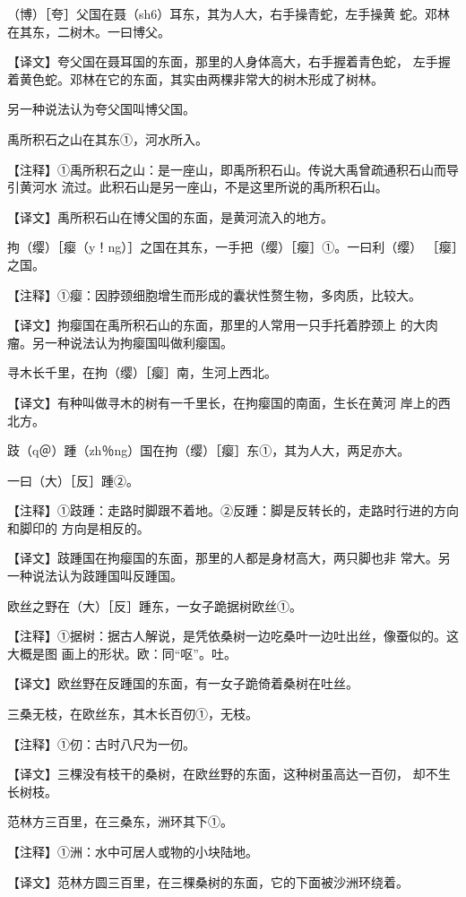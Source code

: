 \documentclass[a4paper,12pt,UTF8,twoside]{ctexbook}
\begin{document}
（博）［夸］父国在聂（sh6）耳东，其为人大，右手操青蛇，左手操黄 蛇。邓林在其东，二树木。一曰博父。

【译文】夸父国在聂耳国的东面，那里的人身体高大，右手握着青色蛇， 左手握着黄色蛇。邓林在它的东面，其实由两棵非常大的树木形成了树林。

另一种说法认为夸父国叫博父国。

禹所积石之山在其东①，河水所入。

【注释】①禹所积石之山：是一座山，即禹所积石山。传说大禹曾疏通积石山而导引黄河水 流过。此积石山是另一座山，不是这里所说的禹所积石山。

【译文】禹所积石山在博父国的东面，是黄河流入的地方。

拘（缨）［瘿（y！ng）］之国在其东，一手把（缨）［瘿］①。一曰利（缨） ［瘿］之国。

【注释】①瘿：因脖颈细胞增生而形成的囊状性赘生物，多肉质，比较大。

【译文】拘瘿国在禹所积石山的东面，那里的人常用一只手托着脖颈上 的大肉瘤。另一种说法认为拘瘿国叫做利瘿国。

寻木长千里，在拘（缨）［瘿］南，生河上西北。

【译文】有种叫做寻木的树有一千里长，在拘瘿国的南面，生长在黄河 岸上的西北方。

跂（q＠）踵（zh％ng）国在拘（缨）［瘿］东①，其为人大，两足亦大。

一曰（大）［反］踵②。

【注释】①跂踵：走路时脚跟不着地。②反踵：脚是反转长的，走路时行进的方向和脚印的 方向是相反的。

【译文】跂踵国在拘瘿国的东面，那里的人都是身材高大，两只脚也非 常大。另一种说法认为跂踵国叫反踵国。

欧丝之野在（大）［反］踵东，一女子跪据树欧丝①。

【注释】①据树：据古人解说，是凭依桑树一边吃桑叶一边吐出丝，像蚕似的。这大概是图 画上的形状。欧：同“呕”。吐。

【译文】欧丝野在反踵国的东面，有一女子跪倚着桑树在吐丝。

三桑无枝，在欧丝东，其木长百仞①，无枝。

【注释】①仞：古时八尺为一仞。

【译文】三棵没有枝干的桑树，在欧丝野的东面，这种树虽高达一百仞， 却不生长树枝。

范林方三百里，在三桑东，洲环其下①。

【注释】①洲：水中可居人或物的小块陆地。

【译文】范林方圆三百里，在三棵桑树的东面，它的下面被沙洲环绕着。
\end{document}

